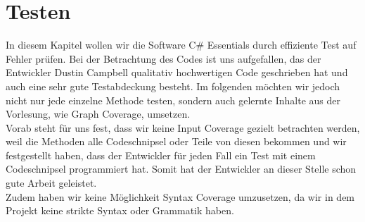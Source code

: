 %
\section{Testen}
In diesem Kapitel wollen wir die Software C\# Essentials durch effiziente Test auf Fehler prüfen. Bei der Betrachtung des Codes ist uns aufgefallen, das der Entwickler Dustin Campbell qualitativ hochwertigen Code geschrieben hat und auch eine sehr gute Testabdeckung besteht. Im folgenden möchten wir jedoch nicht nur jede einzelne Methode testen, sondern auch gelernte Inhalte aus der Vorlesung, wie Graph Coverage, umsetzen.\\
Vorab steht für uns fest, dass wir keine Input Coverage gezielt betrachten werden, weil die Methoden alle Codeschnipsel oder Teile von diesen bekommen und wir festgestellt haben, dass der Entwickler für jeden Fall ein Test mit einem Codeschnipsel programmiert hat. Somit hat der Entwickler an dieser Stelle schon gute Arbeit geleistet.\\
Zudem haben wir keine Möglichkeit Syntax Coverage umzusetzen, da wir in dem Projekt keine strikte Syntax oder Grammatik haben.

